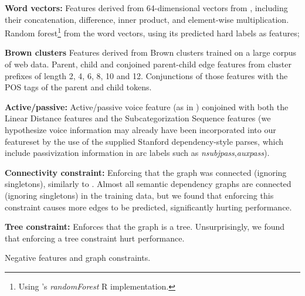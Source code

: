 \documentclass[11pt]{article}
\begin{document}
\begin{table}
\begin{framed}
\begin{small}

\textbf{Word vectors:} Features derived from 64-dimensional vectors from  \cite{wordVectors}, including their
concatenation, difference, inner product, and element-wise multiplication. Random forest\footnote{Using \cite{RandomForest2002}'s \emph{randomForest} R implementation.}
from the word vectors, using its predicted hard labels as features;

\textbf{Brown clusters} Features derived from Brown clusters \cite{Brown:1992:CNG:176313.176316}
trained on a large corpus of web data. Parent, child and conjoined parent-child edge features from cluster prefixes of length 2, 4, 6, 8, 10 and 12. Conjunctions of those features with the POS tags of the parent and
child tokens.


\textbf{Active/passive:} Active/passive voice feature
(as in ) conjoined with both the Linear
Distance features and the Subcategorization Sequence features (we hypothesize
voice information may already have been incorporated into our featureset by the
use of the supplied Stanford dependency-style parses, which include
passivization information in arc labels such as \emph{nsubjpass},\emph{auxpass}).

\textbf{Connectivity constraint:} Enforcing that the graph was connected (ignoring singletons), similarly
to . Almost all semantic dependency graphs are connected (ignoring singletons) in the
training data, but we found that enforcing this constraint causes more edges to be predicted, significantly hurting
performance.

\textbf{Tree constraint:} Enforces that the graph is a tree. Unsurprisingly, we found that enforcing a tree constraint hurt performance.

\end{small}
\end{framed}
\caption{Negative features and graph constraints.}
\label{table:negedgefeatures}
\end{table}


\end{document}
